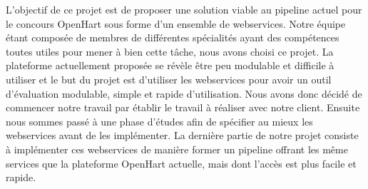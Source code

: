 L'objectif de ce projet est de proposer une solution viable au pipeline actuel pour le concours OpenHart sous forme d'un ensemble de webservices. Notre équipe étant composée de membres de différentes spécialités ayant des compétences toutes utiles pour mener à bien cette tâche, nous avons choisi ce projet.
 La plateforme actuellement proposée se révèle être peu modulable et difficile à utiliser et le but du projet est d'utiliser les webservices pour avoir un outil d'évaluation modulable, simple et rapide d'utilisation. Nous avons donc décidé de commencer notre travail par établir le travail à réaliser avec notre client. Ensuite nous sommes passé à une phase d'études afin de spécifier au mieux les webservices avant de les implémenter. La dernière partie de notre projet consiste à implémenter ces webservices de manière former un pipeline offrant les même services que la plateforme OpenHart actuelle, mais dont l'accès est plus facile et rapide.